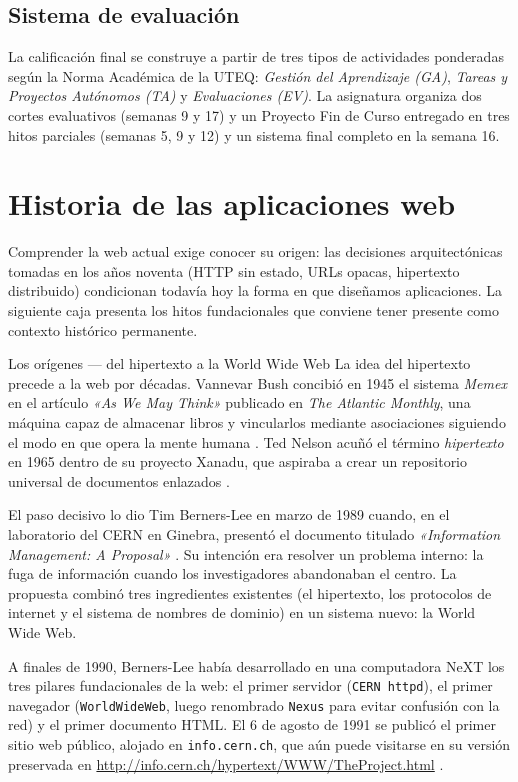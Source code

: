 \documentclass[11pt,a4paper,openany]{book}
\begin{document}
\subsection{Sistema de evaluación}

La calificación final se construye a partir de tres tipos de
actividades ponderadas según la Norma Académica de la UTEQ:
\emph{Gestión del Aprendizaje (GA)}, \emph{Tareas y Proyectos
Autónomos (TA)} y \emph{Evaluaciones (EV)}. La asignatura organiza dos
cortes evaluativos (semanas 9 y 17) y un Proyecto Fin de Curso
entregado en tres hitos parciales (semanas 5, 9 y 12) y un sistema
final completo en la semana 16.

\section{Historia de las aplicaciones web}

Comprender la web actual exige conocer su origen: las decisiones
arquitectónicas tomadas en los años noventa (HTTP sin estado, URLs
opacas, hipertexto distribuido) condicionan todavía hoy la forma en
que diseñamos aplicaciones. La siguiente caja presenta los hitos
fundacionales que conviene tener presente como contexto histórico
permanente.


\begin{cajahistoria}{Los orígenes --- del hipertexto a la World Wide Web}
La idea del hipertexto precede a la web por décadas. Vannevar Bush
concibió en 1945 el sistema \emph{Memex} en el artículo \emph{«As We
May Think»} publicado en \emph{The Atlantic Monthly}, una máquina
capaz de almacenar libros y vincularlos mediante asociaciones
siguiendo el modo en que opera la mente humana \cite{bush1945memex}.
Ted Nelson acuñó el término \emph{hipertexto} en 1965 dentro de su
proyecto Xanadu, que aspiraba a crear un repositorio universal de
documentos enlazados \cite{nelson1965xanadu}.

El paso decisivo lo dio Tim Berners-Lee en marzo de 1989 cuando, en el
laboratorio del CERN en Ginebra, presentó el documento titulado
\emph{«Information Management: A Proposal»} \cite{bernerslee1989}. Su
intención era resolver un problema interno: la fuga de información
cuando los investigadores abandonaban el centro. La propuesta combinó
tres ingredientes existentes (el hipertexto, los protocolos de internet
y el sistema de nombres de dominio) en un sistema nuevo: la World Wide
Web.

A finales de 1990, Berners-Lee había desarrollado en una computadora
NeXT los tres pilares fundacionales de la web: el primer servidor
(\texttt{CERN httpd}), el primer navegador (\texttt{WorldWideWeb},
luego renombrado \texttt{Nexus} para evitar confusión con la red) y el
primer documento HTML. El 6 de agosto de 1991 se publicó el primer
sitio web público, alojado en \texttt{info.cern.ch}, que aún puede
visitarse en su versión preservada en
\url{http://info.cern.ch/hypertext/WWW/TheProject.html}
\cite{cern1991firstsite}.
\end{cajahistoria}
\end{document}
